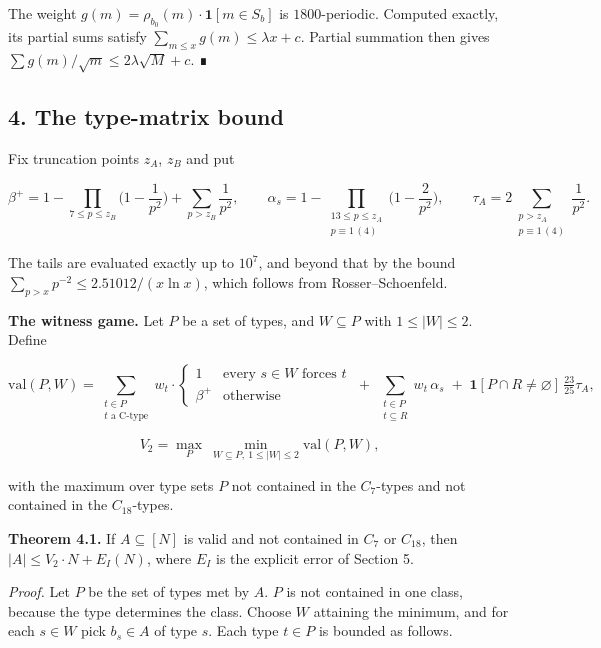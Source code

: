 \documentclass[
  11pt,
]{article}
\begin{document}
The weight \(g(m) = \rho_{b_0}(m)\cdot \mathbf{1}[m \in S_b]\) is
\(1800\)-periodic. Computed exactly, its partial sums satisfy
\(\sum_{m\le x} g(m) \le \lambda x + c\). Partial summation then gives
\(\sum g(m)/\sqrt{m} \le 2\lambda\sqrt{M} + c\). ∎

\subsection{4. The type-matrix bound}

Fix truncation points \(z_A\), \(z_B\) and put

\[\beta^{+} = 1-\prod_{7\le p\le z_B}\Big(1-\frac1{p^2}\Big) + \sum_{p>z_B}\frac1{p^2}, \qquad \alpha_s = 1-\prod_{\substack{13\le p\le z_A\\ p\equiv1\,(4)}}\Big(1-\frac2{p^2}\Big), \qquad \tau_A = 2\sum_{\substack{p>z_A\\ p\equiv1\,(4)}}\frac1{p^2}.\]

The tails are evaluated exactly up to \(10^{7}\), and beyond that by the
bound \(\sum_{p>x} p^{-2} \le 2.51012/(x \ln x)\), which follows from
Rosser--Schoenfeld.

\textbf{The witness game.} Let \(P\) be a set of types, and
\(W \subseteq P\) with \(1 \le |W| \le 2\). Define

\[\mathrm{val}(P,W) = \sum_{\substack{t\in P\\ t \text{ a C-type}}} w_t\cdot\begin{cases}1 & \text{every } s\in W \text{ forces } t\\ \beta^{+} & \text{otherwise}\end{cases} \;+\; \sum_{\substack{t\in P\\ t\subseteq R}} w_t\,\alpha_s \;+\; \mathbf 1[P\cap R\neq\varnothing]\,\tfrac{23}{25}\tau_A,\]

\[V_2 = \max_{P}\ \min_{W\subseteq P,\ 1\le|W|\le 2} \mathrm{val}(P,W),\]

with the maximum over type sets \(P\) not contained in the \(C_7\)-types
and not contained in the \(C_{18}\)-types.

\textbf{Theorem 4.1.} If \(A \subseteq [N]\) is valid and not contained
in \(C_7\) or \(C_{18}\), then \(|A| \le V_2\cdot N + E_I(N)\), where
\(E_I\) is the explicit error of Section 5.

\emph{Proof.} Let \(P\) be the set of types met by \(A\). \(P\) is not
contained in one class, because the type determines the class. Choose
\(W\) attaining the minimum, and for each \(s \in W\) pick \(b_s \in A\)
of type \(s\). Each type \(t \in P\) is bounded as follows.
\end{document}
